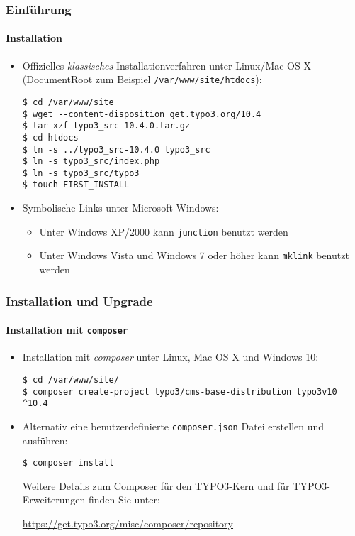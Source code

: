 
\begin{frame}[fragile]
	\frametitle{Einführung}
	\framesubtitle{Installation}

	\begin{itemize}
		\item Offizielles \textit{klassisches} Installationverfahren unter Linux/Mac OS X\newline
			(DocumentRoot zum Beispiel \texttt{/var/www/site/htdocs}):
\begin{lstlisting}
$ cd /var/www/site
$ wget --content-disposition get.typo3.org/10.4
$ tar xzf typo3_src-10.4.0.tar.gz
$ cd htdocs
$ ln -s ../typo3_src-10.4.0 typo3_src
$ ln -s typo3_src/index.php
$ ln -s typo3_src/typo3
$ touch FIRST_INSTALL
\end{lstlisting}

		\item Symbolische Links unter Microsoft Windows:

			\begin{itemize}
				\item Unter Windows XP/2000 kann \texttt{junction} benutzt werden 
				\item Unter Windows Vista und Windows 7 oder höher kann \texttt{mklink} benutzt werden
			\end{itemize}

	\end{itemize}
\end{frame}


\begin{frame}[fragile]
	\frametitle{Installation und Upgrade}
	\framesubtitle{Installation mit \texttt{composer}}

	\begin{itemize}
		\item Installation mit \textit{composer} unter Linux, Mac OS X und Windows 10:
\begin{lstlisting}
$ cd /var/www/site/
$ composer create-project typo3/cms-base-distribution typo3v10 ^10.4
\end{lstlisting}

		\item Alternativ eine benutzerdefinierte \texttt{composer.json} Datei erstellen und ausführen:
\begin{lstlisting}
$ composer install
\end{lstlisting}

			Weitere Details zum Composer für den TYPO3-Kern und für TYPO3-Erweiterungen finden
			Sie unter:

			\small
				\href{https://get.typo3.org/misc/composer/repository}{https://get.typo3.org/misc/composer/repository}
			\normalsize

	\end{itemize}
\end{frame}

